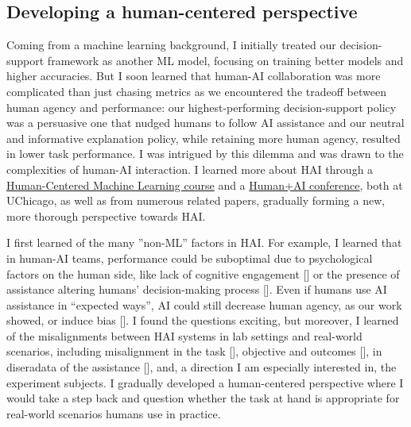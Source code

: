 
\subsection*{Developing a human-centered perspective}






Coming from a machine learning background, I initially treated our decision-support framework as another ML model, focusing on training better models and higher accuracies. But I soon learned that human-AI collaboration was more complicated than just chasing metrics as we encountered the tradeoff between human agency and performance: our highest-performing decision-support policy was a persuasive one that nudged humans to follow AI assistance and our neutral and informative explanation policy, while retaining more human agency, resulted in lower task performance.
I was intrigued by this dilemma and was drawn to the complexities of human-AI interaction. 
I learned more about HAI through a \href{https://github.com/ChicagoHAI/human-centered-machine-learning}{Human-Centered Machine Learning course} and a \href{https://datascience.uchicago.edu/events/human-ai-conference/}{Human+AI conference}, both at UChicago, as well as from numerous related papers, gradually forming a new, more thorough perspective towards HAI.

I first learned of the many ”non-ML” factors in HAI. 
For example, I learned that in human-AI teams, performance could be suboptimal due to psychological factors on the human side, like lack of cognitive engagement [] or the presence of assistance altering humans' decision-making process []. 
Even if humans use AI assistance in “expected ways”, AI could still decrease human agency, as our work showed, or induce bias []. 
I found the questions exciting, but moreover, I learned of the misalignments between HAI systems in lab settings and real-world scenarios, including misalignment in the task [], objective and outcomes [], in diseradata of the assistance [], and, a direction I am especially interested in, the experiment subjects. 
I gradually developed a human-centered perspective where I would take a step back and question whether the task at hand is appropriate for real-world scenarios humans use in practice.



